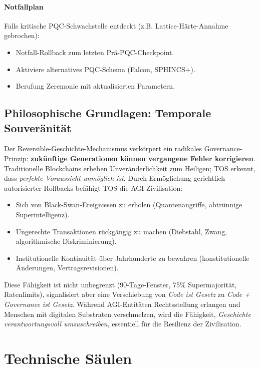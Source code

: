 \documentclass[11pt]{article}
\begin{document}
\paragraph{Notfallplan}
Falls kritische PQC-Schwachstelle entdeckt (z.B. Lattice-Härte-Annahme gebrochen):
\begin{itemize}[noitemsep]
  \item Notfall-Rollback zum letzten Prä-PQC-Checkpoint.
  \item Aktiviere alternatives PQC-Schema (Falcon, SPHINCS+).
  \item Berufung Zeremonie mit aktualisierten Parametern.
\end{itemize}

\subsection{Philosophische Grundlagen: Temporale Souveränität}

Der Reversible-Geschichte-Mechanismus verkörpert ein radikales Governance-Prinzip: \textbf{zukünftige Generationen können vergangene Fehler korrigieren}. Traditionelle Blockchains erheben Unveränderlichkeit zum Heiligen; TOS erkennt, dass \emph{perfekte Voraussicht unmöglich ist}. Durch Ermöglichung gerichtlich autorisierter Rollbacks befähigt TOS die AGI-Zivilisation:
\begin{itemize}[noitemsep]
  \item Sich von Black-Swan-Ereignissen zu erholen (Quantenangriffe, abtrünnige Superintelligenz).
  \item Ungerechte Transaktionen rückgängig zu machen (Diebstahl, Zwang, algorithmische Diskriminierung).
  \item Institutionelle Kontinuität über Jahrhunderte zu bewahren (konstitutionelle Änderungen, Vertragsrevisionen).
\end{itemize}

Diese Fähigkeit ist nicht unbegrenzt (90-Tage-Fenster, 75\% Supermajorität, Ratenlimits), signalisiert aber eine Verschiebung von \emph{Code ist Gesetz} zu \emph{Code + Governance ist Gesetz}. Während AGI-Entitäten Rechtsstellung erlangen und Menschen mit digitalen Substraten verschmelzen, wird die Fähigkeit, \emph{Geschichte verantwortungsvoll umzuschreiben}, essentiell für die Resilienz der Zivilisation.

\section{Technische Säulen}
\end{document}
